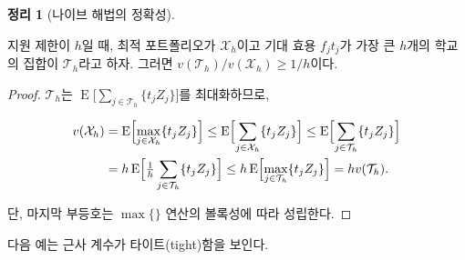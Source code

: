 \documentclass[11pt]{article} %
\newif\ifen
\newtheorem{theorem}{Theorem}
\theoremstyle{definition}
\newtheorem{theorem}{정리}
\theoremstyle{definition}
\begin{document}
\begin{theorem}[\ifen Accuracy of the na\"ive algorithm\else 나이브 해법의 정확성\fi] \label{oneoverhopt}
\ifen 
When the application limit is $h$, let $\mathcal{X}_h$ denote the optimal portfolio, and $\mathcal{T}_h$ the set of the $h$ schools having the largest values of $f_j t_j$. Then $v(\mathcal{T}_h) / v(\mathcal{X}_h) \geq 1/h$. 
\else
지원 제한이 $h$일 때, 최적 포트폴리오가 $\mathcal{X}_h$이고 기대 효용 $f_j t_j$가 가장 큰 $h$개의 학교의 집합이 $\mathcal{T}_h$라고 하자. 그러면 $v(\mathcal{T}_h) / v(\mathcal{X}_h) \geq 1/h$이다.
\fi
\end{theorem}
\begin{proof}
\ifen
Because $\mathcal{T}_h$ maximizes the quantity $\operatorname{E}\bigl[ \sum_{j \in \mathcal{T}_h}\{ t_j Z_j \}\bigr]$, we have
\else
$\mathcal{T}_h$는 $\operatorname{E}\bigl[ \sum_{j \in \mathcal{T}_h}\{ t_j Z_j \}\bigr]$를 최대화하므로,
\fi
\begin{align} \label{oneoverhopt}
\begin{split}
v(\mathcal{X}_h) &= \operatorname{E}\Bigl[ \max_{j \in \mathcal{X}_h}\{ t_j Z_j \}\Bigr] \leq \operatorname{E}\Bigl[ \sum_{j \in \mathcal{X}_h}\{ t_j Z_j \}\Bigr] \leq \operatorname{E}\Bigl[ \sum_{j \in \mathcal{T}_h}\{ t_j Z_j \}\Bigr] \\
&= h  \operatorname{E}\Bigl[ \tfrac{1}{h} \sum_{j \in \mathcal{T}_h}\{ t_j Z_j \}\Bigr]
\leq h  \operatorname{E}\Bigl[ \max_{j \in \mathcal{T}_h}\{ t_j Z_j \}\Bigr]
= h v(\mathcal{T}_h).
\end{split}
\end{align}
\ifen 
where the final inequality follows from the concavity of the $\max\{\}$ operator.
\else
단, 마지막 부등호는 $\max\{\}$ 연산의 볼록성에 따라 성립한다.
\fi
\end{proof}
\ifen
\noindent The following example establishes the tightness of the approximation factor. 
\else
\noindent 다음 예는 근사 계수가 타이트(tight)함을 보인다.
\fi
\end{document}
